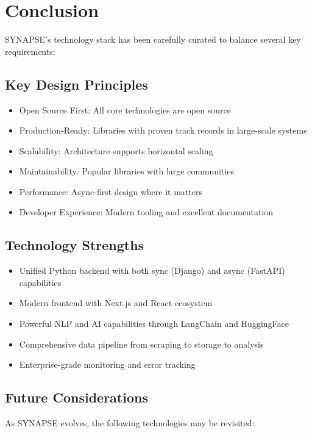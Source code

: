 \documentclass[12pt,a4paper]{report}
\begin{document}
\chapter{Conclusion}

SYNAPSE's technology stack has been carefully curated to balance several key requirements:

\section{Key Design Principles}

\begin{itemize}
    \item Open Source First: All core technologies are open source
    \item Production-Ready: Libraries with proven track records in large-scale systems
    \item Scalability: Architecture supports horizontal scaling
    \item Maintainability: Popular libraries with large communities
    \item Performance: Async-first design where it matters
    \item Developer Experience: Modern tooling and excellent documentation
\end{itemize}

\section{Technology Strengths}

\begin{itemize}
    \item Unified Python backend with both sync (Django) and async (FastAPI) capabilities
    \item Modern frontend with Next.js and React ecosystem
    \item Powerful NLP and AI capabilities through LangChain and HuggingFace
    \item Comprehensive data pipeline from scraping to storage to analysis
    \item Enterprise-grade monitoring and error tracking
\end{itemize}

\section{Future Considerations}

As SYNAPSE evolves, the following technologies may be revisited:
\end{document}
